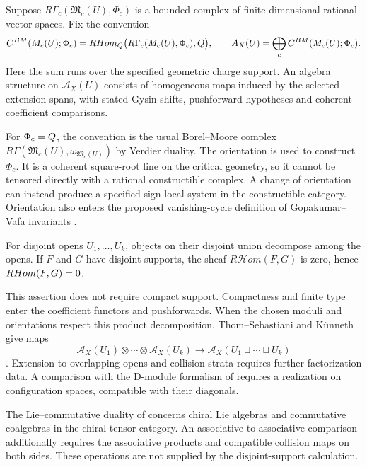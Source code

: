 \begin{definition}
\label{def:local-protected-observable-algebra}
Suppose $R\Gamma_c(\mathfrak M_c(U),\Phi_c)$ is a bounded complex
of finite-dimensional rational vector spaces.  Fix the convention
\[
C^{BM}(M_c(U);\Phi_c)
=RHom_{Q}\bigl(R\Gamma_c(M_c(U),\Phi_c),Q\bigr),
\qquad
A_X(U)=\bigoplus_c
C^{BM}(M_c(U);\Phi_c).
\]
Here the sum runs over the specified geometric charge support.
An algebra structure on $\mathcal A_X(U)$ consists of homogeneous
maps induced by the selected extension spans, with stated Gysin
shifts, pushforward hypotheses and coherent coefficient comparisons.
\end{definition}

For $\Phi_c=Q$, the convention is the usual Borel--Moore complex
$R\Gamma(\mathfrak M_c(U),\omega_{\mathfrak M_c(U)})$ by Verdier
duality.  The orientation is used to construct $\Phi_c$.  It is a
coherent square-root line on the critical geometry, so it cannot be
tensored directly with a rational constructible complex.  A change
of orientation can instead produce a specified sign local system
in the constructible category.  Orientation also enters the proposed
vanishing-cycle definition of Gopakumar--Vafa invariants
\cite[\S1.2]{MaulikTodaGV}.

For disjoint opens $U_1,\ldots,U_k$, objects on their disjoint union
decompose among the opens.  If $F$ and $G$ have disjoint supports,
the sheaf $R\mathcal Hom(F,G)$ is zero, hence $RHom(F,G)=0$.

This assertion does not require compact support.  Compactness and
finite type enter the coefficient functors and pushforwards.
When the chosen moduli and orientations respect this product
decomposition, Thom--Sebastiani and K\"unneth give maps
\[
\mathcal A_X(U_1)\otimes\cdots\otimes\mathcal A_X(U_k)
\longrightarrow\mathcal A_X(U_1\sqcup\cdots\sqcup U_k)
\]
\cite{MasseyST,SaitoMHM}.  Extension to overlapping opens and
collision strata requires further factorization data.
A comparison with the D-module formalism of \cite[\S3.4]{BD}
requires a realization on configuration spaces, compatible with
their diagonals.

The Lie--commutative duality of \cite{FrancisGaitsgoryCKD} concerns
chiral Lie algebras and commutative coalgebras in the chiral tensor
category.  An associative-to-associative comparison
\cite{ChiralBarCobarVolI,ChiralBarCobarVolII} additionally requires
the associative products and compatible collision maps on both sides.
These operations are not supplied by the disjoint-support calculation.

